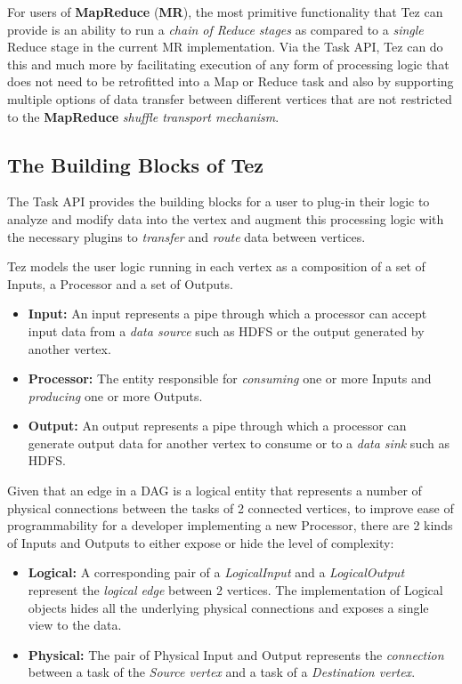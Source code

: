 \documentclass[twocolumn]{article}
\begin{document}
For users of \textbf{MapReduce} (\textbf{MR}), the most primitive
functionality that Tez can provide is an ability to run a \emph{chain of
Reduce stages} as compared to a \emph{single} Reduce stage in the
current MR implementation. Via the Task API, Tez can do this and much
more by facilitating execution of any form of processing logic that does
not need to be retrofitted into a Map or Reduce task and also by
supporting multiple options of data transfer between different vertices
that are not restricted to the \textbf{MapReduce} \emph{shuffle
transport mechanism}.

\subsection{The Building Blocks of Tez}

The Task API provides the building blocks for a user to plug-in their
logic to analyze and modify data into the vertex and augment this
processing logic with the necessary plugins to \emph{transfer} and
\emph{route} data between vertices.

Tez models the user logic running in each vertex as a composition of a
set of Inputs, a Processor and a set of Outputs.

\begin{itemize}

\item
  \textbf{Input:} An input represents a pipe through which a processor
  can accept input data from a \emph{data source} such as HDFS or the
  output generated by another vertex.
\item
  \textbf{Processor:} The entity responsible for \emph{consuming} one or
  more Inputs and \emph{producing} one or more Outputs.
\item
  \textbf{Output:} An output represents a pipe through which a processor
  can generate output data for another vertex to consume or to a
  \emph{data sink} such as HDFS.
\end{itemize}

Given that an edge in a DAG is a logical entity that represents a number
of physical connections between the tasks of 2 connected vertices, to
improve ease of programmability for a developer implementing a new
Processor, there are 2 kinds of Inputs and Outputs to either expose or
hide the level of complexity:

\begin{itemize}
\item
  \textbf{Logical:} A corresponding pair of a \emph{LogicalInput} and a
  \emph{LogicalOutput} represent the \emph{logical edge} between 2
  vertices. The implementation of Logical objects hides all the
  underlying physical connections and exposes a single view to the
  data.
\item
  \textbf{Physical:} The pair of Physical Input and Output represents
  the \emph{connection} between a task of the \emph{Source vertex} and a
  task of a \emph{Destination vertex}.
\end{itemize}
\end{document}
